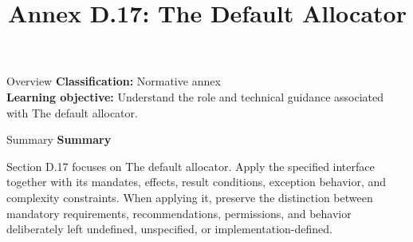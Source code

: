 \documentclass[10pt,letterpaper]{article}
\title{Annex D.17: The Default Allocator}
\author{}
\date{}
\begin{document}
\maketitle
\begin{CornellOverviewBox}{Overview}
\textbf{Classification:} Normative annex\\[2pt]
\textbf{Learning objective:} Understand the role and technical guidance associated with The default allocator.
\end{CornellOverviewBox}\begin{CornellSummaryBox}{Summary}
{\sffamily\bfseries\color{Accent} Summary}\par\vspace{3pt}Section D.17 focuses on The default allocator. Apply the specified interface together with its mandates, effects, result conditions, exception behavior, and complexity constraints. When applying it, preserve the distinction between mandatory requirements, recommendations, permissions, and behavior deliberately left undefined, unspecified, or implementation-defined.
\end{CornellSummaryBox}
\end{document}
